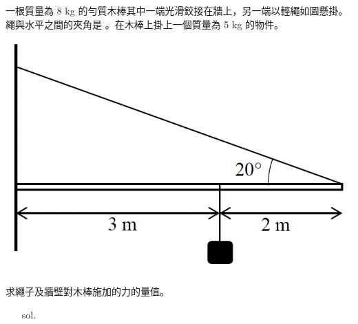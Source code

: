 \documentclass[beamer=true]{standalone}
\begin{document}
\begin{eg}
    一根質量為 8 kg 的勻質木棒其中一端光滑鉸接在牆上，另一端以輕繩如圖懸掛。繩與水平之間的夾角是 。在木棒上掛上一個質量為 5 kg 的物件。
    {\par\centering
    \includegraphics[width=.35\textwidth]{assets/b6070d24.png}
    \par}
    求繩子及牆壁對木棒施加的力的量值。
\end{eg}
\begin{eg}
    \begin{itemize}
        \item [sol.]
    \end{itemize}
\end{eg}
\end{document}
